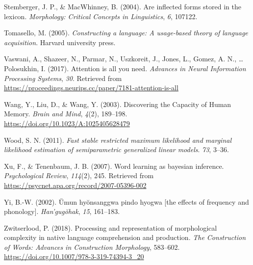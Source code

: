 \documentclass[
  man,floatsintext]{apa6}
\newlength{\cslhangindent}
\newenvironment{CSLReferences}[2] %
 {\begin{list}{}{%
  \setlength{\itemindent}{0pt}
  \setlength{\leftmargin}{0pt}
  \setlength{\parsep}{0pt}
  \ifodd #1
   \setlength{\leftmargin}{\cslhangindent}
   \setlength{\itemindent}{-1\cslhangindent}
  \fi
  \setlength{\itemsep}{#2\baselineskip}}}
 {\end{list}}
\begin{document}
\begin{CSLReferences}{1}{0}
Stemberger, J. P., \& MacWhinney, B. (2004). Are inflected forms stored in the lexicon. \emph{Morphology: Critical Concepts in Linguistics}, \emph{6}, 107122.

Tomasello, M. (2005). \emph{Constructing a language: A usage-based theory of language acquisition}. Harvard university press.

Vaswani, A., Shazeer, N., Parmar, N., Uszkoreit, J., Jones, L., Gomez, A. N., \ldots{} Polosukhin, I. (2017). Attention is all you need. \emph{Advances in Neural Information Processing Systems}, \emph{30}. Retrieved from \url{https://proceedings.neurips.cc/paper/7181-attention-is-all}

Wang, Y., Liu, D., \& Wang, Y. (2003). Discovering the Capacity of Human Memory. \emph{Brain and Mind}, \emph{4}(2), 189--198. \url{https://doi.org/10.1023/A:1025405628479}

Wood, S. N. (2011). \emph{Fast stable restricted maximum likelihood and marginal likelihood estimation of semiparametric generalized linear models}. \emph{73}, 3--36.

Xu, F., \& Tenenbaum, J. B. (2007). Word learning as bayesian inference. \emph{Psychological Review}, \emph{114}(2), 245. Retrieved from \url{https://psycnet.apa.org/record/2007-05396-002}

Yi, B.-W. (2002). Ŭmun hyŏnsanggwa pindo hyogwa {[}the effects of frequency and phonology{]}. \emph{Han'gugŏhak}, \emph{15}, 161--183.

Zwitserlood, P. (2018). Processing and representation of morphological complexity in native language comprehension and production. \emph{The Construction of Words: Advances in Construction Morphology}, 583--602. \url{https://doi.org/10.1007/978-3-319-74394-3_20}

\end{CSLReferences}
\end{document}
